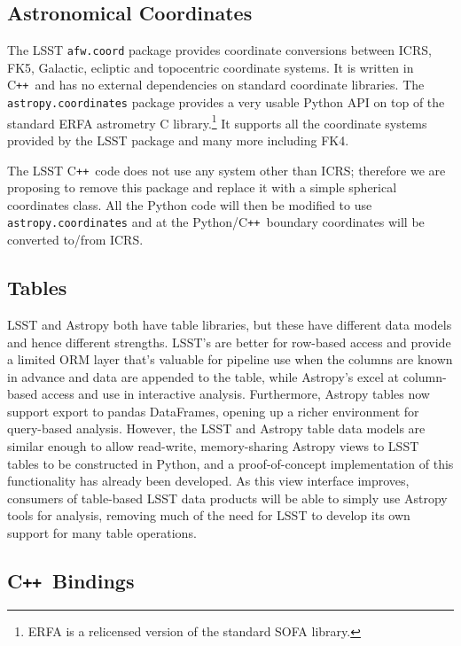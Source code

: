 \documentclass[]{spie}  %
\newcommand{\CPP}{C\texttt{++}\xspace}  %
\begin{document}
\subsection{Astronomical Coordinates}
\label{sec:coords}

The LSST \texttt{afw.coord} package provides coordinate conversions between ICRS, FK5, Galactic, ecliptic and topocentric coordinate systems.
It is written in \CPP\ and has no external dependencies on standard coordinate libraries.
The \texttt{astropy.coordinates} package provides a very usable Python API on top of the standard ERFA astrometry C library.\footnote{ERFA is a relicensed version of the standard SOFA library\cite{2011SchpJ...611404H}.}
It supports all the coordinate systems provided by the LSST package and many more including FK4.

The LSST \CPP\ code does not use any system other than ICRS; therefore we are proposing to remove this package and replace it with a simple spherical coordinates class.
All the Python code will then be modified to use \texttt{astropy.coordinates} and at the Python/\CPP\ boundary coordinates will be converted to/from ICRS.

\subsection{Tables}

LSST and Astropy both have table libraries, but these have different data models and hence different strengths.
LSST's are better for row-based access and provide a limited ORM layer that's valuable for pipeline use when the columns are known in advance and data are appended to the table, while Astropy's excel at column-based access and use in interactive analysis.
Furthermore, Astropy tables now support export to pandas DataFrames\cite{mckinney-proc-scipy-2010}, opening up a richer environment for query-based analysis.
However, the LSST and Astropy table data models are similar enough to allow read-write, memory-sharing Astropy views to LSST tables to be constructed in Python, and a proof-of-concept implementation of this functionality has already been developed.
As this view interface improves, consumers of table-based LSST data products will be able to simply use Astropy tools for analysis, removing much of the need for LSST to develop its own support for many table operations.

\subsection{\CPP\ Bindings}
\label{sec:bindings}
\end{document}
